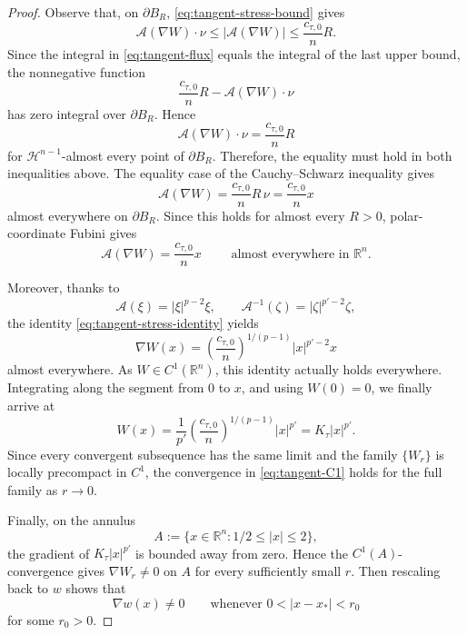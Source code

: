 \documentclass[10pt,a4paper]{amsart}
\newcommand{\Acal}{\mathcal A}
\newcommand{\R}{\mathbb R}
\begin{document}
\begin{proof}
Observe that, on $\partial B_R$, \eqref{eq:tangent-stress-bound} gives
$$
\Acal(\nabla W)\cdot\nu \le |\Acal(\nabla W)|\le \frac{c_{\tau,0}}nR.
$$
Since the integral in \eqref{eq:tangent-flux} equals the
integral of the last upper bound, the nonnegative function
$$
\frac{c_{\tau,0}}nR -\Acal(\nabla W)\cdot\nu
$$
has zero integral over $\partial B_R$.  Hence
$$
\Acal(\nabla W)\cdot\nu =\frac{c_{\tau,0}}nR
$$
for $\mathcal H^{n-1}$-almost every point of
$\partial B_R$.
Therefore, the equality must hold in both inequalities above. The equality case of the Cauchy--Schwarz inequality gives
$$
\Acal(\nabla W) = \frac{c_{\tau,0}}nR\,\nu
= \frac{c_{\tau,0}}n x
$$
almost everywhere on $\partial B_R$.
Since this holds for almost every $R>0$, polar-coordinate
Fubini gives
\begin{equation}\label{eq:tangent-stress-identity}
\Acal(\nabla W) =\frac{c_{\tau,0}}n x \qquad \text{ almost everywhere in }\R^n.
\end{equation}

 
Moreover, thanks to 
$$
\Acal(\xi)=|\xi|^{p-2}\xi, \qquad \Acal^{-1}(\zeta)=|\zeta|^{p'-2}\zeta,
$$
the identity \eqref{eq:tangent-stress-identity} yields
$$
\nabla W(x) =\left(\frac{c_{\tau,0}}n\right)^{1/(p-1)}
    |x|^{p'-2}x
$$
almost everywhere.  As $W\in C^1(\R^n)$, this identity actually holds everywhere.  Integrating along the segment from $0$ to $x$, and using $W(0)=0$, we finally arrive at
$$
W(x) = \frac1 {p'} \left(\frac{c_{\tau,0}}n\right)^{1/(p-1)} |x|^{p'} = K_\tau|x|^{p'}.
$$
Since every convergent subsequence has the same limit and the
family $\{W_r\}$ is locally precompact in $C^1$, the
convergence in \eqref{eq:tangent-C1} holds for the full family
as $r\to 0$.

Finally, on the annulus
$$
    A:=\{x\in\R^n:1/2\le|x|\le2\},
$$
the gradient of $K_\tau|x|^{p'}$ is bounded away from zero.
Hence the $C^1(A)$-convergence gives
$\nabla W_r\ne 0$ on $A$
for every sufficiently small $r$.
Then rescaling back to $w$ shows that
$$
 \nabla w(x)\ne 0 \qquad \text{whenever }0<|x-x_*|<r_0
$$
for some $r_0>0$.
\end{proof}
\end{document}
